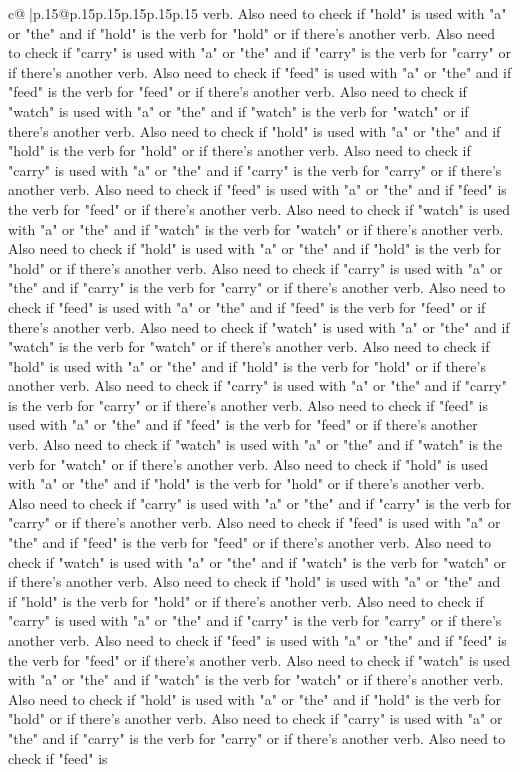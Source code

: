 \documentclass{article}
\begin{document}
{\begin{supertabular}{c@{$\;$}|p{.15\linewidth}@{}p{.15\linewidth}p{.15\linewidth}p{.15\linewidth}p{.15\linewidth}p{.15\linewidth}}
{{{verb. Also need to check if "hold" is used with "a" or "the" and if "hold" is the verb for "hold" or if there's another verb. Also need to check if "carry" is used with "a" or "the" and if "carry" is the verb for "carry" or if there's another verb. Also need to check if "feed" is used with "a" or "the" and if "feed" is the verb for "feed" or if there's another verb. Also need to check if "watch" is used with "a" or "the" and if "watch" is the verb for "watch" or if there's another verb. Also need to check if "hold" is used with "a" or "the" and if "hold" is the verb for "hold" or if there's another verb. Also need to check if "carry" is used with "a" or "the" and if "carry" is the verb for "carry" or if there's another verb. Also need to check if "feed" is used with "a" or "the" and if "feed" is the verb for "feed" or if there's another verb. Also need to check if "watch" is used with "a" or "the" and if "watch" is the verb for "watch" or if there's another verb. Also need to check if "hold" is used with "a" or "the" and if "hold" is the verb for "hold" or if there's another verb. Also need to check if "carry" is used with "a" or "the" and if "carry" is the verb for "carry" or if there's another verb. Also need to check if "feed" is used with "a" or "the" and if "feed" is the verb for "feed" or if there's another verb. Also need to check if "watch" is used with "a" or "the" and if "watch" is the verb for "watch" or if there's another verb. Also need to check if "hold" is used with "a" or "the" and if "hold" is the verb for "hold" or if there's another verb. Also need to check if "carry" is used with "a" or "the" and if "carry" is the verb for "carry" or if there's another verb. Also need to check if "feed" is used with "a" or "the" and if "feed" is the verb for "feed" or if there's another verb. Also need to check if "watch" is used with "a" or "the" and if "watch" is the verb for "watch" or if there's another verb. Also need to check if "hold" is used with "a" or "the" and if "hold" is the verb for "hold" or if there's another verb. Also need to check if "carry" is used with "a" or "the" and if "carry" is the verb for "carry" or if there's another verb. Also need to check if "feed" is used with "a" or "the" and if "feed" is the verb for "feed" or if there's another verb. Also need to check if "watch" is used with "a" or "the" and if "watch" is the verb for "watch" or if there's another verb. Also need to check if "hold" is used with "a" or "the" and if "hold" is the verb for "hold" or if there's another verb. Also need to check if "carry" is used with "a" or "the" and if "carry" is the verb for "carry" or if there's another verb. Also need to check if "feed" is used with "a" or "the" and if "feed" is the verb for "feed" or if there's another verb. Also need to check if "watch" is used with "a" or "the" and if "watch" is the verb for "watch" or if there's another verb. Also need to check if "hold" is used with "a" or "the" and if "hold" is the verb for "hold" or if there's another verb. Also need to check if "carry" is used with "a" or "the" and if "carry" is the verb for "carry" or if there's another verb. Also need to check if "feed" is }}}
\end{supertabular}}
\end{document}
